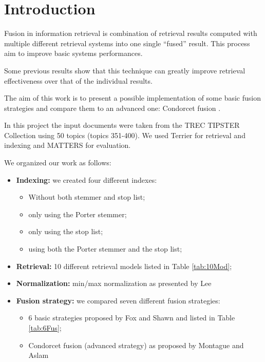 


    \printTitle
    \newpage
    \tableofcontents
    \newpage

    \section{Introduction}
      Fusion in information retrieval is combination of retrieval results computed with multiple different retrieval systems into one single ``fused'' result. This process aim to improve basic systems performances. 
   
   Some previous results show that this technique  can greatly improve retrieval
   effectiveness over that of the individual results.
   
   The aim of this work is to present a possible implementation of some basic
   fusion strategies and compare them to an advanced one: Condorcet fusion \cite{3}.
   
   In this project the input documents were taken from the TREC TIPSTER Collection using 50 topics (topics 351-400).
   We used Terrier for retrieval and indexing and MATTERS for evaluation.
   
   We organized our work as follows:

    \begin{itemize}
        \item \textbf{Indexing:} we created four different indexes:
        \begin{itemize}
        	\item Without both stemmer and stop list;
        	\item only using the Porter stemmer;
        	\item only using the stop list;
        	\item using both the Porter stemmer and the stop list;
        \end{itemize}
        \item \textbf{Retrieval:} 10 different retrieval models listed in Table \ref{tab:10Mod};
		\item \textbf{Normalization:} min/max normalization as presented by Lee \cite{1}
        \item \textbf{Fusion strategy:} we compared seven different fusion strategies:
            \begin{itemize}
                \item 6 basic strategies proposed by Fox and Shawn \cite{2} and listed in Table \ref{tab:6Fus};
                \item Condorcet fusion (advanced strategy) as proposed by Montague and Aslam \cite{3}
            \end{itemize}
    \end{itemize}

